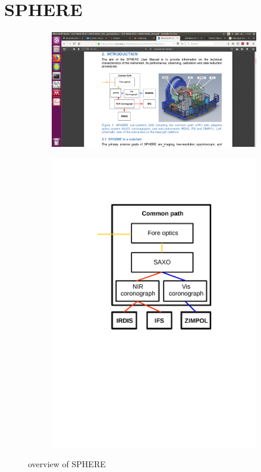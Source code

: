 \documentclass[twoside,single]{lion-msc}
\begin{document}
\section{SPHERE}
\begin{figure}[hb]
\centering
\begin{subfigure}{.58\textwidth}
  \centering
  \includegraphics[trim={25cm 6cm 7cm 8.8cm},clip,width = 1\linewidth]{overviewSPHERE}
  \caption{\citep{Observatory2007}}
\end{subfigure}\hfill
\begin{subfigure}{.38\textwidth}
  \centering
  \includegraphics[trim={5cm 12cm 3.5cm 3.5cm},clip,width=1\linewidth]{overview_SPHERE}
  \caption{}
\end{subfigure}
\caption{overview of SPHERE}
\label{fig:overviewSPHERE}
\end{figure}
\end{document}
